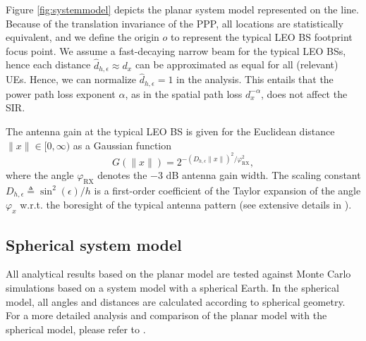 \documentclass[lettersize,journal]{IEEEtran}
\newtheorem*{remark}{Remark}
\begin{document}
Figure \ref{fig:systemmodel} depicts the planar system model represented on the line. Because of the translation invariance of the PPP, all locations are statistically equivalent, and we define the origin $\textit{o}$ to represent the typical LEO BS footprint focus point. We assume a fast-decaying narrow beam for the typical LEO BSs, hence each distance $\hat{d}_{h,\epsilon} \approx {d}_{x}$ can be approximated as equal for all (relevant) UEs. Hence, we can normalize $\hat{d}_{h,\epsilon}=1$ in the analysis. This entails that the power path loss exponent $\alpha$, as in the spatial path loss ${d}^{-\alpha}_{x}$, does not affect the SIR.

The antenna gain at the typical LEO BS is given for the Euclidean distance $\|x\| \in [0, \infty)$ as a Gaussian function
  \begin{equation}
    \label{eq:Gaussianantpat}
    G(\|x\|) = 2^{-(D_{h,\epsilon}\|x\|)^2 / \varphi_{\text{RX}}^2},
  \end{equation}
  where the angle $\varphi_{\text{RX}}$ denotes the $-3$ dB antenna gain width. The scaling constant $D_{h,\epsilon} \triangleq \sin^2(\epsilon)/h$ is a first-order coefficient of the Taylor expansion of the angle $\varphi_x$ w.r.t. the boresight of the typical antenna pattern (see extensive details in \cite{10909705}).




  \subsection{Spherical system model}
  All analytical results based on the planar model are tested against Monte Carlo simulations based on a system model with a spherical Earth. In the spherical model, all angles and distances are calculated according to spherical geometry. For a more detailed analysis and comparison of the planar model with the spherical model, please refer to  \cite{10909705}.
  
\end{document}
